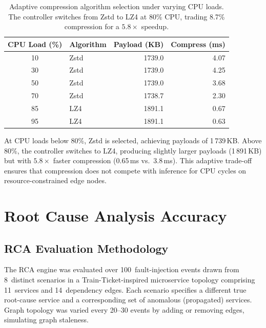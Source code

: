 \begin{table}[H]
    \centering
    \begin{tabular}{|c|l|r|r|}
        \hline
        \textbf{CPU Load (\%)} & \textbf{Algorithm} &
        \textbf{Payload (KB)} & \textbf{Compress (ms)} \\
        \hline
        10 & Zstd & 1739.0 & 4.07 \\
        30 & Zstd & 1739.0 & 4.25 \\
        50 & Zstd & 1739.0 & 3.68 \\
        70 & Zstd & 1738.7 & 2.30 \\
        \hline
        85 & LZ4 & 1891.1 & 0.67 \\
        95 & LZ4 & 1891.1 & 0.63 \\
        \hline
    \end{tabular}
    \caption{Adaptive compression algorithm selection under varying CPU loads.
             The controller switches from Zstd to LZ4 at 80\% CPU, trading
             8.7\% compression for a $5.8\times$ speedup.}
    \label{tab:adaptive_compression}
\end{table}

At CPU loads below 80\%, Zstd is selected, achieving payloads of 1\,739\,KB.
Above 80\%, the controller switches to LZ4, producing slightly larger payloads
(1\,891\,KB) but with $5.8\times$ faster compression (0.65\,ms vs.\ 3.8\,ms).
This adaptive trade-off ensures that compression does not compete with
inference for CPU cycles on resource-constrained edge nodes.

\section{Root Cause Analysis Accuracy}
\label{sec:eval_rca}

\subsection{RCA Evaluation Methodology}
\label{subsec:eval_rca_methodology}

The RCA engine was evaluated over 100~fault-injection events drawn from
8~distinct scenarios in a Train-Ticket-inspired microservice topology
comprising 11~services and 14~dependency edges. Each scenario specifies a
different true root-cause service and a corresponding set of anomalous
(propagated) services. Graph topology was varied every 20--30 events by
adding or removing edges, simulating graph staleness.

